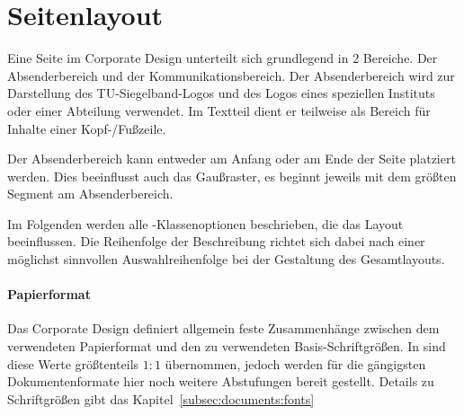 \section{Seitenlayout}\label{sec:pagelayout}

Eine Seite im Corporate Design unterteilt sich grundlegend in 2 Bereiche.
Der Absenderbereich und der Kommunikationsbereich. Der Absenderbereich wird zur
Darstellung des TU-Siegelband-Logos und des Logos eines speziellen Instituts
oder einer Abteilung verwendet. Im Textteil dient er teilweise als Bereich für
Inhalte einer Kopf-/Fußzeile.

Der Absenderbereich kann entweder am Anfang oder am Ende der Seite platziert
werden. Dies beeinflusst auch das Gaußraster, es beginnt jeweils mit dem
größten Segment am Absenderbereich.
\bigskip

Im Folgenden werden alle \tubslatex-Klassenoptionen beschrieben,
die das Layout beeinflussen. Die Reihenfolge der Beschreibung richtet sich dabei
nach einer möglichst sinnvollen Auswahlreihenfolge bei der Gestaltung des Gesamtlayouts.

\paragraph{Papierformat}\hfill

Das Corporate Design definiert allgemein feste Zusammenhänge zwischen dem
verwendeten Papierformat und den zu verwendeten Basis-Schriftgrößen.
In \tubslatex sind diese Werte größtenteils $1:1$ übernommen, jedoch
werden für die gängigsten Dokumentenformate hier noch weitere Abstufungen 
bereit gestellt. Details zu Schriftgrößen gibt das Kapitel~\ref{subsec:documents:fonts}

\begin{Declaration}
  \\
  \\
  \\
  \\
  \\
  \\
\end{Declaration}

